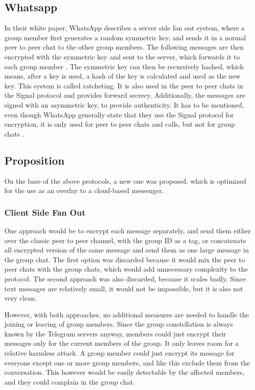 \documentclass[a4paper, oneside]{discothesis}
\begin{document}
\subsection{Whatsapp}

In their white paper, WhatsApp describes a server side fan out system, where a group member first generates a random symmetric key, and sends it in a normal peer to peer chat to the other group members. The following messages are then encrypted with the symmetric key and sent to the server, which forwards it to each group member \cite{Whatsapp}. The symmetric key can then be recursively hashed, which means, after a key is used, a hash of the key is calculated and used as the new key. This system is called ratcheting. It is also used in the peer to peer chats in the Signal protocol and provides forward secrecy. Additionally, the messages are signed with an asymmetric key, to provide authenticity. It has to be mentioned, even though WhatsApp generally state that they use the Signal protocol for encryption, it is only used for peer to peer chats and calls, but not for group chats \cite{Newbedev}.

\subsection{Proposition}
On the base of the above protocols, a new one was proposed, which is optimized for the use as an overlay to a cloud-based messenger.

\subsubsection{Client Side Fan Out}
\label{sec:server_side_fan_out}

One approach would be to encrypt each message separately, and send them either over the classic peer to peer channel, with the group ID as a tag, or concatenate all encrypted version of the same message and send them as one large message in the group chat. The first option was discarded because it would mix the peer to peer chats with the group chats, which would add unnecessary complexity to the protocol. The second approach was also discarded, because it scales badly. Since text messages are relatively small, it would not be impossible, but it is also not very clean.

However, with both approaches, no additional measures are needed to handle the joining or leaving of group members. Since the group constellation is always known by the Telegram servers anyway, members could just encrypt their messages only for the current members of the group. It only leaves room for a relative harmless attack. A group member could just encrypt its message for everyone except one or more group members, and like this exclude them from the conversation. This however would be easily detectable by the affected members, and they could complain in the group chat. 
\end{document}
